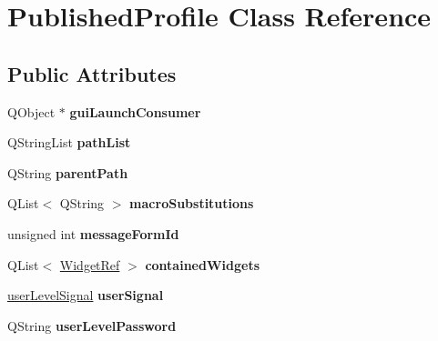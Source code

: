 \hypertarget{classPublishedProfile}{
\section{PublishedProfile Class Reference}
\label{classPublishedProfile}
}
\subsection*{Public Attributes}
\begin{DoxyCompactItemize}
\item 
\hypertarget{classPublishedProfile_afab60a7c3eaf1d9c02dbb9025f226008}{
QObject $\ast$ {\bfseries guiLaunchConsumer}}
\label{classPublishedProfile_afab60a7c3eaf1d9c02dbb9025f226008}

\item 
\hypertarget{classPublishedProfile_ae559df159b9f1c74ed13bdb56564b555}{
QStringList {\bfseries pathList}}
\label{classPublishedProfile_ae559df159b9f1c74ed13bdb56564b555}

\item 
\hypertarget{classPublishedProfile_a723fc865720076e60c164f7089a8208c}{
QString {\bfseries parentPath}}
\label{classPublishedProfile_a723fc865720076e60c164f7089a8208c}

\item 
\hypertarget{classPublishedProfile_a2bbb11efa1440120edd3b0438476d647}{
QList$<$ QString $>$ {\bfseries macroSubstitutions}}
\label{classPublishedProfile_a2bbb11efa1440120edd3b0438476d647}

\item 
\hypertarget{classPublishedProfile_a0e9094400c031dbfbe2d04786d639aa1}{
unsigned int {\bfseries messageFormId}}
\label{classPublishedProfile_a0e9094400c031dbfbe2d04786d639aa1}

\item 
\hypertarget{classPublishedProfile_ae65856560ee1663c621503784ec08f06}{
QList$<$ \hyperlink{classWidgetRef}{WidgetRef} $>$ {\bfseries containedWidgets}}
\label{classPublishedProfile_ae65856560ee1663c621503784ec08f06}

\item 
\hypertarget{classPublishedProfile_a8ad00fac8fa9aa23d42c8384e72cf54f}{
\hyperlink{classuserLevelSignal}{userLevelSignal} {\bfseries userSignal}}
\label{classPublishedProfile_a8ad00fac8fa9aa23d42c8384e72cf54f}

\item 
\hypertarget{classPublishedProfile_a08c8aace1a2c585e8395d31d770f29ad}{
QString {\bfseries userLevelPassword}}
\label{classPublishedProfile_a08c8aace1a2c585e8395d31d770f29ad}


\end{DoxyCompactItemize}
